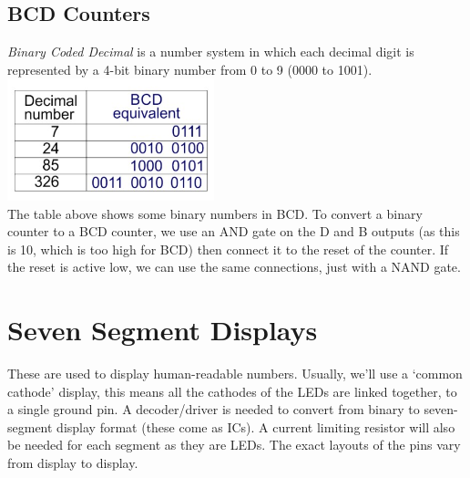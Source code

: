\documentclass[a4paper,11pt, twocolumn]{article}
\begin{document}
\subsection{BCD Counters}
\textit{Binary Coded Decimal} is a number system in which each decimal digit is represented by a 4-bit binary number from 0 to 9 (0000 to 1001). \\
\includegraphics[width=0.45\textwidth]{bcdDecimal.jpg}\\
The table above shows some binary numbers in BCD. To convert a binary counter to a BCD counter, we use an AND gate on the D and B outputs (as this is 10, which is too high for BCD) then connect it to the reset of the counter. If the reset is active low, we can use the same connections, just with a NAND gate. 

\section{Seven Segment Displays}
These are used to display human-readable numbers. Usually, we'll use a `common cathode' display, this means all the cathodes of the LEDs are linked together, to a single ground pin. A decoder/driver is needed to convert from binary to seven-segment display format (these come as ICs). A current limiting resistor will also be needed for each segment as they are LEDs. The exact layouts of the pins vary from display to display.
\end{document}
